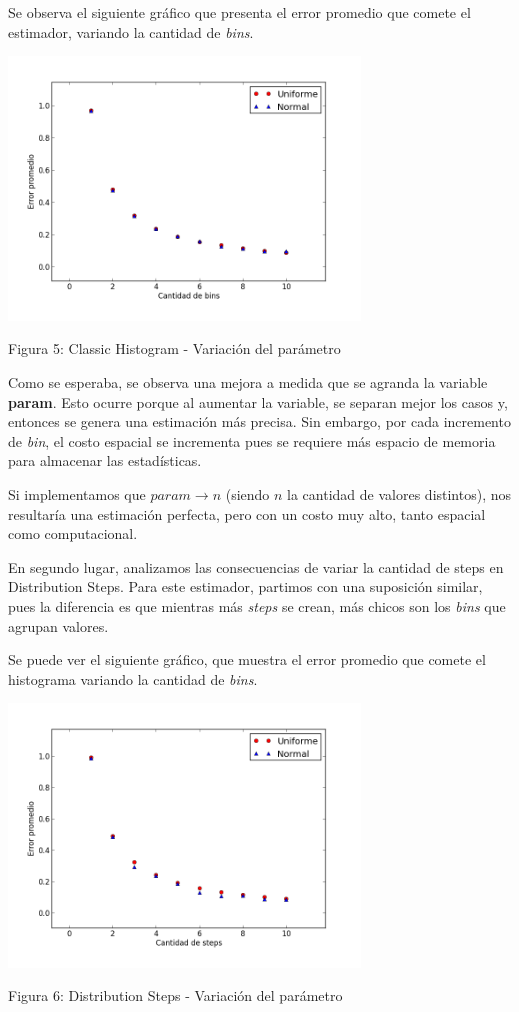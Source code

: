 \documentclass[10pt, a4paper,english,spanish,hidelinks]{article}
\begin{document}
Se observa el siguiente gráfico que presenta el error promedio que comete el estimador, variando
la cantidad de \textit{bins}.


\centerline{  \includegraphics[width=0.7\textwidth]{./imagenes/ejb2_classic_parameter_variation.png}}
\centerline{Figura 5: Classic Histogram - Variación del parámetro}

Como se esperaba, se observa una mejora a medida que se agranda la variable \textbf{param}.
Esto ocurre porque al aumentar la variable, se separan mejor los casos y, entonces se genera una estimación más precisa.
Sin embargo, por cada incremento de \textit{bin}, el costo espacial se incrementa pues se requiere
más espacio de memoria para almacenar las estadísticas.

Si implementamos que $param \rightarrow n$ (siendo $n$ la cantidad de valores distintos), nos
resultaría una estimación perfecta, pero con un costo muy alto, tanto espacial como computacional.

En segundo lugar, analizamos las consecuencias de variar la cantidad de steps en Distribution Steps. Para este estimador, partimos con una suposición similar, pues la diferencia es que mientras
más \textit{steps} se crean, más chicos son los \textit{bins} que agrupan valores.


Se puede ver el siguiente gráfico, que muestra el error promedio que comete el histograma variando
la cantidad de \textit{bins}.

\centerline{  \includegraphics[width=0.7\textwidth]{./imagenes/ejb2_step_parameter_variation.png}}
\centerline{Figura 6: Distribution Steps - Variación del parámetro}
\end{document}
